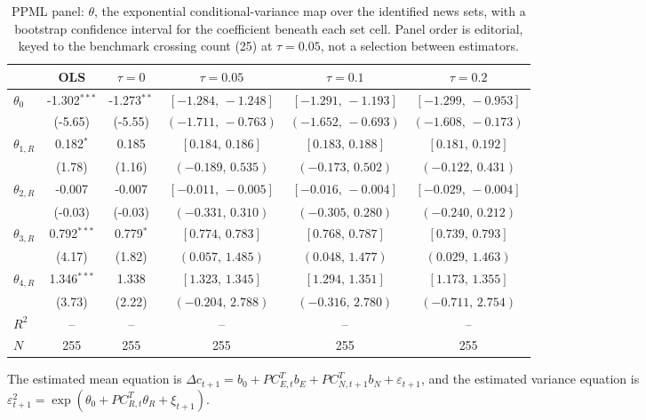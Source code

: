 \begin{table}[!htbp]
\centering
\begin{threeparttable}
\caption{PPML panel: $\theta$, the exponential conditional-variance map over the identified news sets, with a bootstrap confidence interval for the coefficient beneath each set cell. Panel order is editorial, keyed to the benchmark crossing count (25) at $\tau{=}0.05$, not a selection between estimators.}
\label{tab:log_var_eq_panel_ppml}
\footnotesize\setlength{\tabcolsep}{3pt}
\begin{tabular}{lccccc}
\toprule
 & OLS & $\tau{=}0$ & $\tau{=}0.05$ & $\tau{=}0.1$ & $\tau{=}0.2$ \\
\midrule
$\theta_0$ & -1.302$^{***}$ & -1.273$^{**}$ & $[-1.284,\,-1.248]$ & $[-1.291,\,-1.193]$ & $[-1.299,\,-0.953]$ \\
 & (-5.65) & (-5.55) & $(-1.711,\,-0.763)$ & $(-1.652,\,-0.693)$ & $(-1.608,\,-0.173)$ \\
\midrule
$\theta_{1,R}$ & 0.182$^{*}$ & 0.185 & $[0.184,\,0.186]$ & $[0.183,\,0.188]$ & $[0.181,\,0.192]$ \\
 & (1.78) & (1.16) & $(-0.189,\,0.535)$ & $(-0.173,\,0.502)$ & $(-0.122,\,0.431)$ \\
$\theta_{2,R}$ & -0.007 & -0.007 & $[-0.011,\,-0.005]$ & $[-0.016,\,-0.004]$ & $[-0.029,\,-0.004]$ \\
 & (-0.03) & (-0.03) & $(-0.331,\,0.310)$ & $(-0.305,\,0.280)$ & $(-0.240,\,0.212)$ \\
$\theta_{3,R}$ & 0.792$^{***}$ & 0.779$^{*}$ & $[0.774,\,0.783]$ & $[0.768,\,0.787]$ & $[0.739,\,0.793]$ \\
 & (4.17) & (1.82) & $(0.057,\,1.485)$ & $(0.048,\,1.477)$ & $(0.029,\,1.463)$ \\
$\theta_{4,R}$ & 1.346$^{***}$ & 1.338 & $[1.323,\,1.345]$ & $[1.294,\,1.351]$ & $[1.173,\,1.355]$ \\
 & (3.73) & (2.22) & $(-0.204,\,2.788)$ & $(-0.316,\,2.780)$ & $(-0.711,\,2.754)$ \\
$R^2$ & -- & -- & -- & -- & -- \\
$N$ & 255 & 255 & 255 & 255 & 255 \\
\bottomrule
\end{tabular}
\begin{tablenotes}[flushleft]
\scriptsize
\item The estimated mean equation is $\Delta c_{t+1}=b_{0}+PC_{E,t}^{T}b_{E}+ PC_{N,t+1}^{T}b_{N}+\varepsilon_{t+1}$, and the estimated variance equation is $\varepsilon_{t+1}^{2}= \exp(\theta_{0}+PC_{R,t}^{T}\theta_{R}+\xi_{t+1})$.

\end{tablenotes}
\end{threeparttable}
\end{table}
